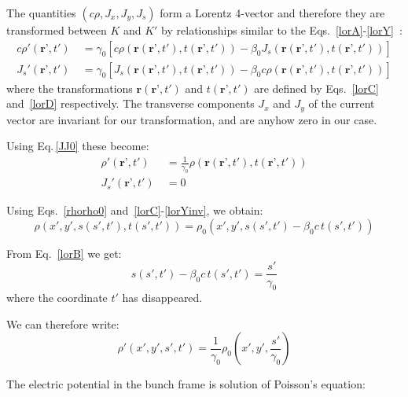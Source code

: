 The quantities $\left(c \rho, J_x, J_y, J_s\right)$ form a Lorentz 4-vector and therefore they are transformed between $K$ and $K'$ by relationships similar to the Eqs.~\ref{lorA}-\ref{lorY}~\cite{jackson}:
\begin{align}
c\rho' \left(\textbf{r'}, t'\right)\ &= \gamma_0 \left[c \rho  \left(\textbf{r}\left(\textbf{r'}, t'\right), t\left(\textbf{r'}, t'\right)\right) -\beta_0 J_s \left(\textbf{r}\left(\textbf{r'}, t'\right), t\left(\textbf{r'}, t'\right)\right) \right]\label{lorrho}\\
J_s' \left(\textbf{r'}, t'\right)\ &= \gamma_0 \left[J_s  \left(\textbf{r}\left(\textbf{r'}, t'\right), t\left(\textbf{r'}, t'\right)\right) -\beta_0 c \rho \left(\textbf{r}\left(\textbf{r'}, t'\right), t\left(\textbf{r'}, t'\right)\right) \right]\label{lorjs}
\end{align}
where the transformations $\textbf{r}\left(\textbf{r'}, t'\right)$ and $t\left(\textbf{r'}, t'\right)$ are defined by Eqs.~\ref{lorC} and~\ref{lorD} respectively. The transverse components $J_x$ and $J_y$ of the current vector are invariant for our transformation, and are anyhow zero in our case.

Using Eq.\,\ref{JJ0} these become:
\begin{align}
\rho' \left(\textbf{r'}, t'\right)\ &= \frac{1}{\gamma_0}\rho\left(\textbf{r}\left(\textbf{r'}, t'\right), t\left(\textbf{r'}, t'\right)\right)
\\
J_s' \left(\textbf{r'}, t'\right)\ & = 0
\end{align}

Using Eqs.~\ref{rhorho0} and~\ref{lorC}-\ref{lorYinv}, we obtain:
\begin{equation}
\rho  \left(x', y', s(s', t'), t(s', t')\right) = \rho_0  \left(x', y', s(s', t') - \beta_0 c\,t(s', t')\right)
\end{equation}

From Eq.~\ref{lorB} we get:
\begin{equation}
s(s', t')- \beta_0 c\,t(s', t') = \frac{s'}{\gamma_0} 
\end{equation}
where the coordinate $t' $ has disappeared.

We can therefore write:
\begin{equation}
\rho' \left(x', y', s', t'\right) =   \frac{1}{\gamma_0} \rho_0  \left(x', y',  \frac{s'}{\gamma_0}\right)\label{rhoprimerho0}
\end{equation}

The electric potential in the bunch frame is solution of Poisson's equation:

